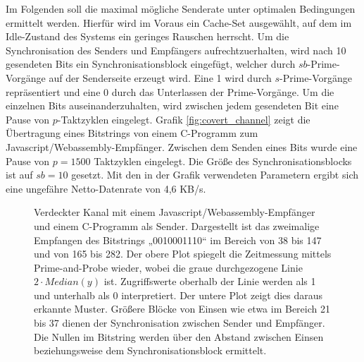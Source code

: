 Im Folgenden soll die maximal mögliche Senderate unter optimalen Bedingungen ermittelt werden. 
Hierfür wird im Voraus ein Cache-Set ausgewählt, auf dem im Idle-Zustand des Systems ein geringes Rauschen herrscht.
Um die Synchronisation des Senders und Empfängers aufrechtzuerhalten, wird nach 10 gesendeten Bits ein Synchronisationsblock eingefügt, welcher durch $sb$-Prime-Vorgänge auf der Senderseite erzeugt wird. 
Eine 1 wird durch $s$-Prime-Vorgänge repräsentiert und eine 0 durch das Unterlassen der Prime-Vorgänge. 
Um die einzelnen Bits auseinanderzuhalten, wird zwischen jedem gesendeten Bit eine Pause von $p$-Taktzyklen eingelegt. 
Grafik \ref{fig:covert_channel} zeigt die Übertragung eines Bitstrings von einem C-Programm zum Javascript/Webassembly-Empfänger.
Zwischen dem Senden eines Bits wurde eine Pause von $p=1500$ Taktzyklen eingelegt.
Die Größe des Synchronisationsblocks ist auf $sb=10$ gesetzt.
Mit den in der Grafik verwendeten Parametern ergibt sich eine ungefähre Netto-Datenrate von 4,6 KB/s.

\captionsetup[figure]{skip=-15pt}
\label{fig:covert_channel}
\begin{figure}[h]
\centering
\begin{scaletikzpicturetowidth}{\textwidth}

\end{scaletikzpicturetowidth}
\caption{Verdeckter Kanal mit einem Javascript/Webassembly-Empfänger und einem C-Programm als Sender. Dargestellt ist das zweimalige Empfangen des Bitstrings „0010001110“ im Bereich von 38 bis 147 und von 165 bis 282. Der obere Plot spiegelt die Zeitmessung mittels Prime-and-Probe wieder, wobei die graue durchgezogene Linie $2 \cdot Median(y)$ ist. Zugriffswerte oberhalb der Linie werden als 1 und unterhalb als 0 interpretiert. Der untere Plot zeigt dies daraus erkannte Muster. Größere Blöcke von Einsen wie etwa im Bereich 21 bis 37 dienen der Synchronisation zwischen Sender und Empfänger. Die Nullen im Bitstring werden über den Abstand zwischen Einsen beziehungsweise dem Synchronisationsblock ermittelt.}
\end{figure}
\captionsetup[figure]{skip=10pt}







